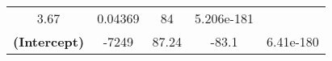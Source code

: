 \documentclass[]{book}
\theoremstyle{definition}
\theoremstyle{definition}
\theoremstyle{remark}
\begin{document}
\begin{longtable}[c]{@{}ccccc@{}}
\begin{minipage}[t]{0.13\columnwidth}\centering\strut
3.67
\strut\end{minipage} &
\begin{minipage}[t]{0.15\columnwidth}\centering\strut
0.04369
\strut\end{minipage} &
\begin{minipage}[t]{0.12\columnwidth}\centering\strut
84
\strut\end{minipage} &
\begin{minipage}[t]{0.12\columnwidth}\centering\strut
5.206e-181
\strut\end{minipage}\tabularnewline
\begin{minipage}[t]{0.35\columnwidth}\centering\strut
\textbf{(Intercept)}
\strut\end{minipage} &
\begin{minipage}[t]{0.13\columnwidth}\centering\strut
-7249
\strut\end{minipage} &
\begin{minipage}[t]{0.15\columnwidth}\centering\strut
87.24
\strut\end{minipage} &
\begin{minipage}[t]{0.12\columnwidth}\centering\strut
-83.1
\strut\end{minipage} &
\begin{minipage}[t]{0.12\columnwidth}\centering\strut
6.41e-180
\strut\end{minipage}\tabularnewline
\bottomrule
\end{longtable}
\end{document}
